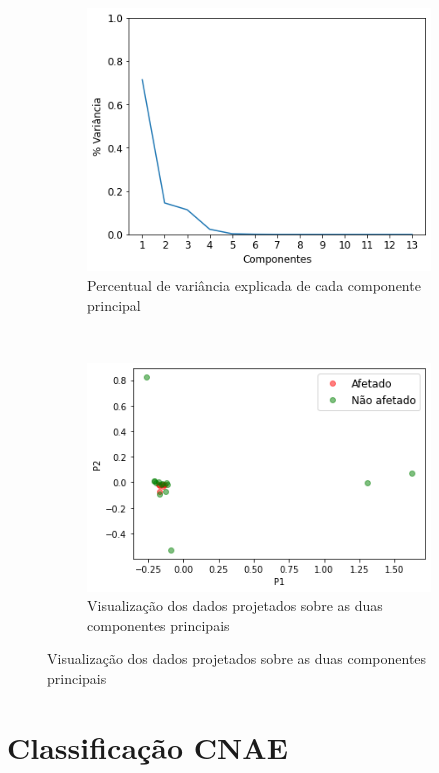 \begin{figure}[htb] 
    \centering 
    \caption{PCA sobre dados totais de seções}
    \label{fig:resultados:base-de-dados-27-pca-components-total-secao} 
    \begin{subfigure}[b]{0.45\textwidth}
        \includegraphics[scale=0.45]{images/base-de-dados-27.1-pca-components-total-secao.png}
        \caption{Percentual de variância explicada de cada componente principal}
        \label{fig:resultados:base-de-dados-27.1-pca-components-total-secao}
    \end{subfigure} ~ \quad
    \begin{subfigure}[b]{0.45\textwidth}
        \includegraphics[scale=0.45]{images/base-de-dados-27.2-pca-2d-total-secao.png}
        \caption{Visualização dos dados projetados sobre as duas componentes principais}
        \label{fig:resultados:base-de-dados-27.2-pca-2d-total-secao}
    \end{subfigure}
    \fdadospesquisa
\end{figure}

\section{Classificação CNAE}

